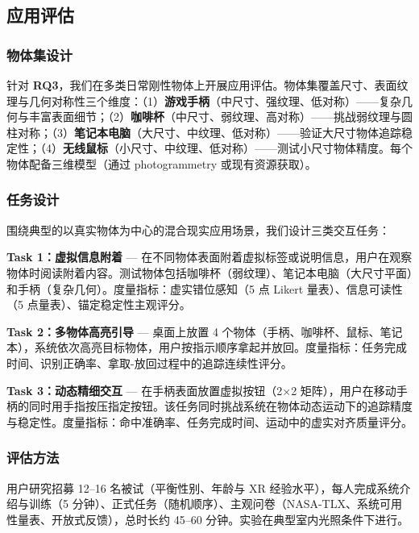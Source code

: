 \documentclass[review]{vgtc}
\begin{document}
\subsection{应用评估}


\subsubsection{物体集设计}


针对 \textbf{RQ3}，我们在多类日常刚性物体上开展应用评估。物体集覆盖尺寸、表面纹理与几何对称性三个维度：（1）\textbf{游戏手柄}（中尺寸、强纹理、低对称）------复杂几何与丰富表面细节；（2）\textbf{咖啡杯}（中尺寸、弱纹理、高对称）------挑战弱纹理与圆柱对称；（3）\textbf{笔记本电脑}（大尺寸、中纹理、低对称）------验证大尺寸物体追踪稳定性；（4）\textbf{无线鼠标}（小尺寸、中纹理、低对称）------测试小尺寸物体精度。每个物体配备三维模型（通过 photogrammetry 或现有资源获取）。

\subsubsection{任务设计}


围绕典型的以真实物体为中心的混合现实应用场景，我们设计三类交互任务：

\textbf{Task 1：虚拟信息附着} --- 在不同物体表面附着虚拟标签或说明信息，用户在观察物体时阅读附着内容。测试物体包括咖啡杯（弱纹理）、笔记本电脑（大尺寸平面）和手柄（复杂几何）。度量指标：虚实错位感知（5 点 Likert 量表）、信息可读性（5 点量表）、锚定稳定性主观评分。

\textbf{Task 2：多物体高亮引导} --- 桌面上放置 4 个物体（手柄、咖啡杯、鼠标、笔记本），系统依次高亮目标物体，用户按指示顺序拿起并放回。度量指标：任务完成时间、识别正确率、拿取-放回过程中的追踪连续性评分。

\textbf{Task 3：动态精细交互} --- 在手柄表面放置虚拟按钮（2×2 矩阵），用户在移动手柄的同时用手指按压指定按钮。该任务同时挑战系统在物体动态运动下的追踪精度与稳定性。度量指标：命中准确率、任务完成时间、运动中的虚实对齐质量评分。

\subsubsection{评估方法}


用户研究招募 12--16 名被试（平衡性别、年龄与 XR 经验水平），每人完成系统介绍与训练（5 分钟）、正式任务（随机顺序）、主观问卷（NASA-TLX、系统可用性量表、开放式反馈），总时长约 45--60 分钟。实验在典型室内光照条件下进行。
\end{document}
